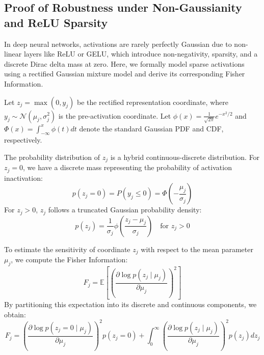 \subsection{Proof of Robustness under Non-Gaussianity and ReLU Sparsity}
\label{sec:app_robustness}

In deep neural networks, activations are rarely perfectly Gaussian due to non-linear layers like ReLU or GELU, which introduce non-negativity, sparsity, and a discrete Dirac delta mass at zero. Here, we formally model sparse activations using a rectified Gaussian mixture model and derive its corresponding Fisher Information.

Let $z_j = \max(0, y_j)$ be the rectified representation coordinate, where $y_j \sim \mathcal{N}(\mu_j, \sigma_j^2)$ is the pre-activation coordinate. Let $\phi(x) = \frac{1}{\sqrt{2\pi}} e^{-x^2/2}$ and $\Phi(x) = \int_{-\infty}^x \phi(t) dt$ denote the standard Gaussian PDF and CDF, respectively. 

The probability distribution of $z_j$ is a hybrid continuous-discrete distribution. For $z_j = 0$, we have a discrete mass representing the probability of activation inactivation:
\begin{equation}
p(z_j = 0) = P(y_j \le 0) = \Phi\left( -\frac{\mu_j}{\sigma_j} \right)
\end{equation}
For $z_j > 0$, $z_j$ follows a truncated Gaussian probability density:
\begin{equation}
p(z_j) = \frac{1}{\sigma_j} \phi\left( \frac{z_j - \mu_j}{\sigma_j} \right) \quad \text{for } z_j > 0
\end{equation}

To estimate the sensitivity of coordinate $z_j$ with respect to the mean parameter $\mu_j$, we compute the Fisher Information:
\begin{equation}
F_{j} = \mathbb{E} \left[ \left( \frac{\partial \log p(z_j \mid \mu_j)}{\partial \mu_j} \right)^2 \right]
\end{equation}
By partitioning this expectation into its discrete and continuous components, we obtain:
\begin{equation}
F_{j} = \left( \frac{\partial \log p(z_j = 0 \mid \mu_j)}{\partial \mu_j} \right)^2 p(z_j = 0) + \int_{0}^{\infty} \left( \frac{\partial \log p(z_j \mid \mu_j)}{\partial \mu_j} \right)^2 p(z_j) dz_j
\end{equation}

